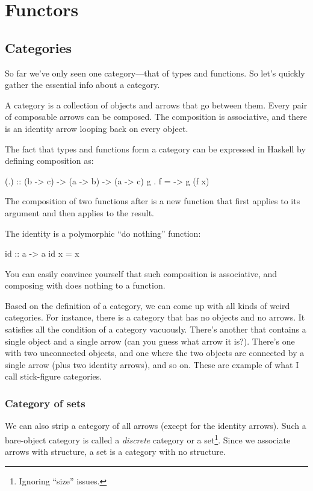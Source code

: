 \documentclass[DaoFP]{subfiles}
\begin{document}
\setcounter{chapter}{7}

\chapter{Functors}
\section{Categories}

So far we've only seen one category---that of types and functions. So let's quickly gather the essential info about a category.

A category is a collection of objects and arrows that go between them. Every pair of composable arrows can be composed. The composition is associative, and there is an identity arrow looping back on every object.

The fact that types and functions form a category can be expressed in Haskell by defining composition as:
\begin{haskell}
(.) :: (b -> c) -> (a -> b) -> (a -> c)
g . f = \x -> g (f x)
\end{haskell}
The composition of two functions  after  is a new function that first applies  to its argument and then applies  to the result.

The identity is a polymorphic ``do nothing'' function:
\begin{haskell}
id :: a -> a
id x = x
\end{haskell}
You can easily convince yourself that such composition is associative, and composing with  does nothing to a function.

Based on the definition of a category, we can come up with all kinds of weird categories. For instance, there is a category that has no objects and no arrows. It satisfies all the condition of a category vacuously. There's another that contains a single object and a single arrow (can you guess what arrow it is?). There's one with two unconnected objects, and one where the two objects are connected by a single arrow (plus two identity arrows), and so on. These are example of what I call stick-figure categories.
\subsection{Category of sets}

We can also strip a category of all arrows (except for the identity arrows). Such a bare-object category is called a \emph{discrete} category or a set\footnote{Ignoring ``size'' issues.}. Since we associate arrows with structure, a set is a category with no structure. 
\end{document}
